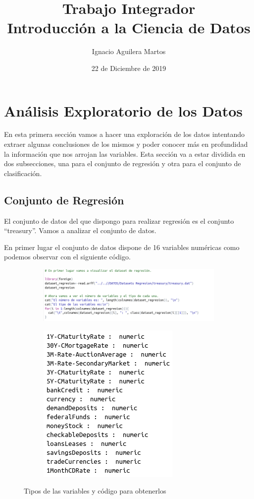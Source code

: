 \documentclass[12pt,a4paper]{article}
\author{Ignacio Aguilera Martos}
\title{Trabajo Integrador \\ Introducción a la Ciencia de Datos}
\date{22 de Diciembre de 2019}
\begin{document}
	\maketitle

	\tableofcontents

	\newpage
	
\section{Análisis Exploratorio de los Datos}

En esta primera sección vamos a hacer una exploración de los datos intentando extraer algunas conclusiones de los mismos y poder conocer más en profundidad la información que nos arrojan las variables. Esta sección va a estar dividida en dos subsecciones, una para el conjunto de regresión y otra para el conjunto de clasificación.

\subsection{Conjunto de Regresión}

El conjunto de datos del que dispongo para realizar regresión es el conjunto ``treasury''. Vamos a analizar el conjunto de datos.

En primer lugar el conjunto de datos dispone de  16 variables numéricas como podemos observar con el siguiente código.

\begin{figure}[H]
	\centering
	\begin{subfigure}{0.47\textwidth}
		\includegraphics[scale=0.35]{./Imagenes/EDA/Regresion/codigo_variables_tipos.png}
	\end{subfigure}
	\begin{subfigure}{0.47\textwidth}
		\includegraphics[scale=0.4]{./Imagenes/EDA/Regresion/variables_tipos.png}
	\end{subfigure}
	\caption{Tipos de las variables y código para obtenerlos}
\end{figure}
\end{document}
